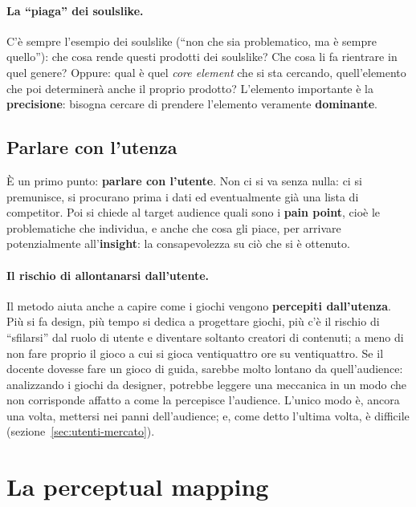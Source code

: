 \paragraph{La ``piaga'' dei soulslike.} C'è sempre l'esempio dei soulslike
(``non che sia problematico, ma è sempre quello''): che cosa rende questi
prodotti dei soulslike? Che cosa li fa rientrare in quel genere? Oppure: qual
è quel \emph{core element} che si sta cercando, quell'elemento che poi
determinerà anche il proprio prodotto? L'elemento importante è la
\textbf{precisione}: bisogna cercare di prendere l'elemento veramente
\textbf{dominante}.

\subsection{Parlare con l'utenza}

È un primo punto: \textbf{parlare con l'utente}. Non ci si va senza nulla: ci
si premunisce, si procurano prima i dati ed eventualmente già una lista di
competitor. Poi si chiede al target audience quali sono i \textbf{pain
point}, cioè le problematiche che individua, e anche che cosa gli piace,
per arrivare potenzialmente all'\textbf{insight}: la consapevolezza su ciò
che si è ottenuto.

\paragraph{Il rischio di allontanarsi dall'utente.} Il metodo aiuta anche a
capire come i giochi vengono \textbf{percepiti dall'utenza}. Più si fa design,
più tempo si dedica a progettare giochi, più c'è il rischio di
``sfilarsi'' dal ruolo di utente e diventare soltanto creatori di contenuti;
a meno di non fare proprio il gioco a cui si gioca ventiquattro ore su
ventiquattro. Se il docente dovesse fare un gioco di guida, sarebbe molto
lontano da quell'audience: analizzando i giochi da designer, potrebbe leggere
una meccanica in un modo che non corrisponde affatto a come la percepisce
l'audience. L'unico modo è, ancora una volta, mettersi nei panni
dell'audience; e, come detto l'ultima volta, è difficile
(sezione~\ref{sec:utenti-mercato}).

\section{La perceptual mapping}
\label{sec:perceptual-mapping}

